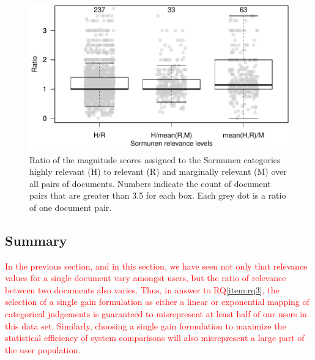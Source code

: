 \begin{figure}[t]
  \centering
  \includegraphics[width=.7\linewidth]{figs/kanoulos_aslam.pdf}
  \caption{Ratio of the magnitude scores assigned to 
    the Sormunen categories highly relevant (H) to relevant (R) and marginally relevant
    (M) over all pairs of documents. Numbers indicate the count of document pairs that 
    are greater than 3.5 for each box. Each grey dot is a ratio of one document pair.
  \label{fig:ka}
    }
\end{figure}

\subsection{Summary}

\textcolor{red}{ In the previous section, and in this section, we have
seen not only that relevance values for a single document vary amongst
users, but the ratio of relevance between two documents also varies.
Thus, in answer to RQ\ref{item:rq3}, the selection of a single gain
formulation as either a linear or exponential mapping of categorical
judgements is guaranteed to misrepresent at least half of our users in
this data set.
Similarly, choosing a single gain formulation to maximize the
statistical efficiency of system comparisons will also misrepresent a
large part of the user population.
} 




